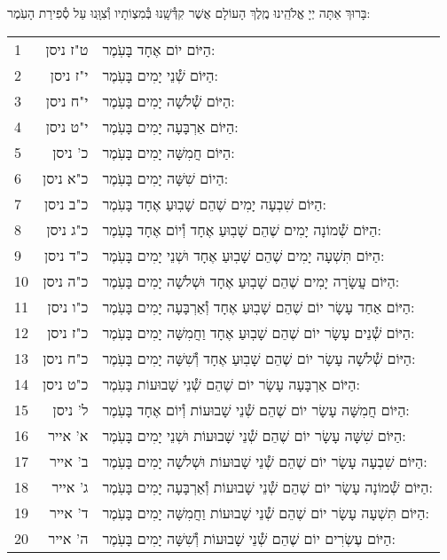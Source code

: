\documentclass[twoside, openany, parskip=half, 11pt]{book}
\begin{document}
בָּרוּךְ אַתָּה יְיָ אֱלֹהֵֽינוּ מֶֽלֶךְ הָעוֹלָם אֲשֶׁר קִדְּ֯שָֽׁנוּ בְּ֯מִצְוֹתָיו וְ֯צִוָּֽנוּ עַל סְ֯פִירַת הָעֹֽמֶר:\\

\begin{scriptsize}
\begin{longtable}{ l | r | p{} }
1 & ט"ז ניסן & הַיּוֹם יוֹם אֶחָד בָּעֹֽמֶר: \\
2 & י"ז ניסן & הַיּוֹם שְׁ֯נֵי יָמִים בָּעֹֽמֶר: \\
3 & י"ח ניסן & הַיּוֹם שְׁ֯לֹשָׁה יָמִים בָּעֹֽמֶר: \\
4 & י"ט ניסן & הַיּוֹם אַרְבָּעָה יָמִים בָּעֹֽמֶר: \\
5 & כ' ניסן & הַיּוֹם חֲמִשָּׁה יָמִים בָּעֹֽמֶר: \\
6 & כ"א ניסן & הַיוֹם שִׁשָּׁה יָמִים בָּעֹֽמֶר: \\
7 & כ"ב ניסן & הַיּוֹם שִׁבְעָה יָמִים שֶׁהֵם שָׁבֽוּעַ אֶחָד בָּעֹֽמֶר: \\
8 & כ"ג ניסן & הַיּוֹם שְׁ֯מוֹנָה יָמִים שֶׁהֵם שָׁבֽוּעַ אֶחָד וְ֯יוֹם אֶחָד בָּעֹֽמֶר: \\
9 & כ"ד ניסן & הַיּוֹם תִּשְׁעָה יָמִים שֶׁהֵם שָׁבֽוּעַ אֶחָד וּשְׁנֵי יָמִים בָּעֹֽמֶר: \\
10 & כ"ה ניסן & הַיּוֹם עֲשָׂרָה יָמִים שֶׁהֵם שָׁבֽוּעַ אֶחָד וּשְׁלֹשָׁה יָמִים בָּעֹֽמֶר: \\
11 & כ"ו ניסן & הַיּוֹם אַחַד עָשָׂר יוֹם שֶׁהֵם שָׁבֽוּעַ אֶחָד וְ֯אַרְבָּעָה יָמִים בָּעֹֽמֶר: \\
12 & כ"ז ניסן & הַיּוֹם שְׁ֯נֵים עָשָׂר יוֹם שֶׁהֵם שָׁבֽוּעַ אֶחָד וַחֲמִשָּׁה יָמִים בָּעֹֽמֶר: \\
13 & כ"ח ניסן & הַיּוֹם שְׁ֯לֹשָׁה עָשָׂר יוֹם שֶׁהֵם שָׁבֽוּעַ אֶחָד וְ֯שִׁשָּׁה יָמִים בָּעֹֽמֶר: \\
14 & כ"ט ניסן & הַיּוֹם אַרְבָּעָה עָשָׂר יוֹם שֶׁהֵם שְׁ֯נֵי שָׁבוּעוֹת בָּעֹֽמֶר: \\
15 & ל' ניסן & הַיּוֹם חֲמִשָּׁה עָשָׂר יוֹם שֶׁהֵם שְׁ֯נֵי שָׁבוּעוֹת וְ֯יוֹם אֶחָד בָּעֹֽמֶר: \\
16 & א' אייר & הַיּוֹם שִׁשָּׁה עָשָׂר יוֹם שֶׁהֵם שְׁ֯נֵי שָׁבוּעוֹת וּשְׁנֵי יָמִים בָּעֹֽמֶר: \\
17 & ב' אייר & הַיּוֹם שִׁבְעָה עָשָׂר יוֹם שֶׁהֵם שְׁ֯נֵי שָׁבוּעוֹת וּשְׁלֹשָׁה יָמִים בָּעֹֽמֶר: \\
18 & ג' אייר & הַיּוֹם שְׁ֯מוֹנָה עָשָׂר יוֹם שֶׁהֵם שְׁ֯נֵי שָׁבוּעוֹת וְ֯אַרְבָּעָה יָמִים בָּעֹֽמֶר: \\
19 & ד' אייר & הַיּוֹם תִּשְׁעָה עָשָׂר יוֹם שֶׁהֵם שְׁ֯נֵי שָׁבוּעוֹת וַחֲמִשָּׁה יָמִים בָּעֹֽמֶר: \\
20 & ה' אייר & הַיּוֹם עֶשְׂרִים יוֹם שֶׁהֵם שְׁ֯נֵי שָׁבוּעוֹת וְ֯שִׁשָּׁה יָמִים בָּעֹֽמֶר: \\

\end{longtable}
\end{scriptsize}
\end{document}

